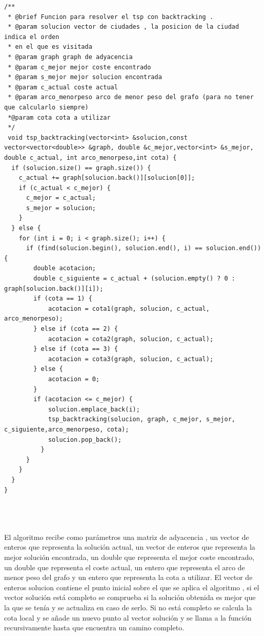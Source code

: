 \documentclass[11pt,openany]{book}
\begin{document}
\begin{lstlisting}
/**
 * @brief Funcion para resolver el tsp con backtracking .
 * @param solucion vector de ciudades , la posicion de la ciudad indica el orden
 * en el que es visitada
 * @param graph graph de adyacencia
 * @param c_mejor mejor coste encontrado
 * @param s_mejor mejor solucion encontrada
 * @param c_actual coste actual
 * @param arco_menorpeso arco de menor peso del grafo (para no tener que calcularlo siempre)
 *@param cota cota a utilizar
 */
 void tsp_backtracking(vector<int> &solucion,const vector<vector<double>> &graph, double &c_mejor,vector<int> &s_mejor, double c_actual, int arco_menorpeso,int cota) {
  if (solucion.size() == graph.size()) {
    c_actual += graph[solucion.back()][solucion[0]];
    if (c_actual < c_mejor) {
      c_mejor = c_actual;
      s_mejor = solucion;
    }
  } else {
    for (int i = 0; i < graph.size(); i++) {
      if (find(solucion.begin(), solucion.end(), i) == solucion.end()) {
        double acotacion;
        double c_siguiente = c_actual + (solucion.empty() ? 0 : graph[solucion.back()][i]);
        if (cota == 1) {
            acotacion = cota1(graph, solucion, c_actual, arco_menorpeso);
        } else if (cota == 2) {
            acotacion = cota2(graph, solucion, c_actual);
        } else if (cota == 3) {
            acotacion = cota3(graph, solucion, c_actual);
        } else {
            acotacion = 0;
        }
        if (acotacion <= c_mejor) {
            solucion.emplace_back(i);
            tsp_backtracking(solucion, graph, c_mejor, s_mejor, c_siguiente,arco_menorpeso, cota);
            solucion.pop_back();
          }
      }
    }
  }
}

  
                
    \end{lstlisting}
    El algoritmo recibe como parámetros una matriz de adyacencia , un vector de enteros que representa la solución actual, un vector de enteros que representa la mejor solución encontrada, un double que representa el mejor coste encontrado, un double que representa el coste actual, un entero que representa el arco de menor peso del grafo y un entero que representa la cota a utilizar.
    El vector de enteros solucion contiene el punto inicial sobre el que se aplica el algoritmo , si el vector solución está completo se comprueba si 
    la solución obtenida es mejor que la que se tenía y se actualiza en caso de serlo. Si no está completo se calcula la cota local y se  añade un nuevo punto al vector solución y se llama a la función recursivamente hasta que encuentra un camino completo.
    
\end{document}
